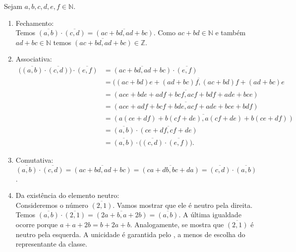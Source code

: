 \documentclass[../main.tex]{subfiles}
\begin{document}
\begin{dem}
    Sejam $a,b,c,d,e,f \in \mathbb{N}$.
    \begin{enumerate}[label=(\roman*)]
        \item Fechamento: \\
        Temos $\overline{(a,b)} \cdot \overline{(c,d)} = \overline{(ac+bd, ad+bc)}$. Como $ac+bd \in \mathbb{N}$ e também $ad+bc \in \mathbb{N}$ temos $\overline{(ac+bd, ad+bc)} \in \mathbb{Z}$.

        \item Associativa: 
        \begin{align*}
            \big(\overline{(a,b)} \cdot \overline{(c,d)}\big) \cdot  \overline{(e,f)} &= \overline{(ac+bd, ad+bc)} \cdot \overline{(e,f)} \\
            &= \overline{((ac+bd)e + (ad+bc)f , (ac+bd)f + (ad+bc)e} \\
            &= \overline{(ace+bde+adf+bcf, acf+bdf+ade+bce)} \\
            &= \overline{(ace+adf+bcf+bde, acf+ade+bce+bdf)} \\
            &= \overline{(a(ce+df) + b(cf+de) , a(cf+de) + b(ce+df))} \\
            &= \overline{(a,b)} \cdot \overline{(ce+df, cf+de)} \\
            &= \overline{(a,b)} \cdot \big( \overline{(c,d)} \cdot \overline{(e,f)} \big).
        \end{align*}
              
        \item Comutativa: \\
        $\overline{(a,b)} \cdot \overline{(c,d)} = \overline{(ac+bd, ad+bc)} =
        \overline{(ca+db, bc+da)} = \overline{(c,d)} \cdot \overline{(a,b)}$ .     
        
        \item Da existência do elemento neutro: \\
        Consideremos o número $\overline{(2,1)}$. Vamos mostrar que ele é neutro pela direita. Temos $\overline{(a,b)} \cdot \overline{(2,1)} = \overline{(2a+b, a+2b)} = \overline{(a,b)}$. A última igualdade ocorre porque $a + a + 2b = b + 2a + b$. Analogamente, se mostra que $\overline{(2,1)}$ é neutro pela esquerda. A unicidade é garantida pelo , a menos de escolha do representante da classe.
        

\end{enumerate}
\end{dem}
\end{document}
